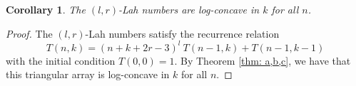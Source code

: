 \documentclass{article}
\newtheorem{corollary}[theorem]{Corollary}
\theoremstyle{definition}
\numberwithin{equation}{section}
\begin{document}
\begin{corollary}
    The $(l,r)$-Lah numbers are log-concave in $k$ for all $n$.
\end{corollary}
\begin{proof}
    The $(l,r)$-Lah numbers satisfy the recurrence relation
    \begin{equation}
        T(n,k)=(n+k+2r-3)^l\ T(n-1,k)+T(n-1,k-1)
    \end{equation}
    with the initial condition $T(0,0)=1$. By Theorem \ref{thm: a,b,c}, we have that this triangular array is log-concave in $k$ for all $n$.
\end{proof}
\end{document}
